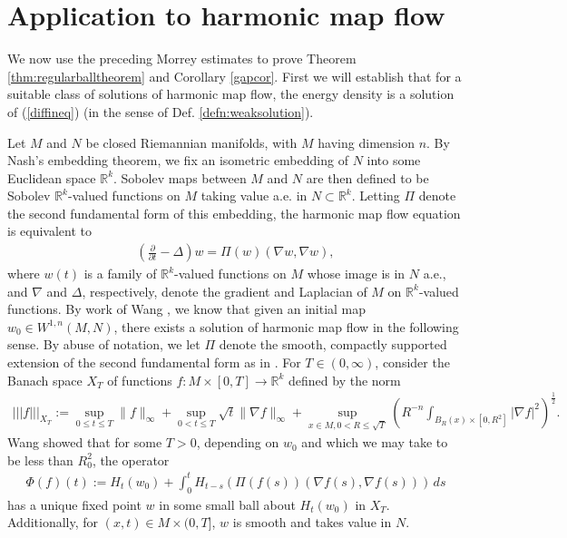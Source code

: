 \documentclass[12pt]{amsart}
\renewcommand{\1}{{\mathbf 1}}
\newcommand{\R}{{\mathbb R}}
\theoremstyle{others}
\numberwithin{equation}{section}
\newcommand{\inj}{\hookrightarrow}
\begin{document}
\section{Application to harmonic map flow}
We now use the preceding Morrey estimates to prove Theorem \ref{thm:regularballtheorem} and Corollary \ref{gapcor}. First we will establish that for a suitable class of solutions of %
harmonic map flow, the energy density is a solution of (\ref{diffineq}) (in the sense of Def. \ref{defn:weaksolution}). \par
Let \(M\) and \(N\) be closed Riemannian manifolds, with \(M\) having dimension \(n\). By Nash's embedding theorem, we fix an isometric embedding of \(N\) into some Euclidean space \(\R^k\). Sobolev maps between \(M\) and \(N\) are then defined to be Sobolev \(\R^k\)-valued functions on \(M\) taking value a.e. in \(N \subset \R^k\). Letting \(\Pi\) denote the second fundamental form of this embedding, the harmonic map flow equation is equivalent to
    \begin{align*}
        \left(\frac{\partial}{\partial t} - \Delta\right) w = \Pi(w)(\nabla w, \nabla w),
    \end{align*} where \(w(t)\) is a family of \(\R^k\)-valued functions on \(M\) whose image is in \(N\) a.e., and \(\nabla\) and \(\Delta\), respectively, denote the gradient and Laplacian of \(M\) on \(\R^k\)-valued functions. By work of Wang \cite{hmfbmo}, we know that given an initial map \(w_0 \in W^{1, n}(M, N)\), there exists a solution of harmonic map flow in the following sense. By abuse of notation, we let \(\Pi\) denote the smooth, compactly supported extension of the second fundamental form %
    as in \cite[pg. 11]{hmfbmo}. For \(T \in (0, \infty)\), consider the Banach space \(X_T\) of functions \(f : M \times [0, T] \to \R^k\) defined by the norm
   \begin{align*}
       ||| f|||_{X_T} := \sup_{0 \leq t \leq T} \|f\|_\infty + \sup_{0 < t \leq T} \sqrt{t} \|\nabla f\|_\infty + \sup_{x \in M, 0 < R \leq \sqrt{T}} \left(R^{-n} \int_{B_R(x) \times [0, R^2]} |\nabla f|^2 \right)^{\frac{1}{2}}.
   \end{align*} Wang showed that for some \(T > 0\), depending on \(w_0\) and which we may take to be less than \(R_0^2\), the operator 
   \begin{align*}
       \Phi(f)(t) := H_t(w_0) + \int_0^t H_{t-s}(\Pi(f(s))(\nabla f(s), \nabla f(s))) \, ds
   \end{align*} has a unique fixed point \(w\) in some small ball about \(H_t(w_0)\) in \(X_T\). Additionally, for \((x, t) \in M \times (0, T]\), \(w\) is smooth and takes value in \(N\). \par
\end{document}
